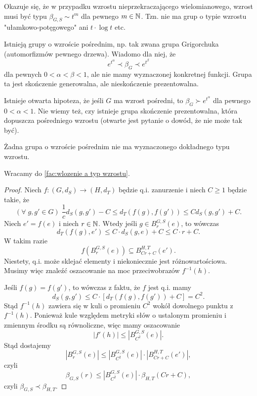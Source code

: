 Okazuje się, że w przypadku wzrostu nieprzekraczającego wielomianowego, wzrost musi być typu $\beta_{G,S}\sim t^m$ dla pewnego $m\in\mathbb{N}$. Tzn. nie ma grup o typie wzrostu "ułamkowo-potęgowego" ani $t\cdot\log t$ etc.

Istnieją grupy o wzroście pośrednim, np. tak zwana grupa Grigorchuka (automorfizmów pewnego drzewa). Wiadomo dla niej, że 
$$e^{t^\alpha}\prec \beta_G\prec e^{t^\beta}$$
dla pewnych $0<\alpha<\beta<1$, ale nie mamy wyznaczonej konkretnej funkcji. Grupa ta jest skończenie generowalna, ale nieskończenie prezentowalna.

Istnieje otwarta hipoteza, że jeśli $G$ ma wzrost pośredni, to $\beta_G\succ e^{t^\alpha}$ dla pewnego $0<\alpha<1$. Nie wiemy też, czy istnieje grupa skończenie prezentowalna, która dopuszcza pośredniego wzrostu (otwarte jest pytanie o dowód, że nie może tak być).

Żadna grupa o wzroście pośrednim nie ma wyznaczonego dokładnego typu wzrostu.

Wracamy do \ref{fac:wlozenie a typ wzrostu}.

\begin{proof}

  Niech $f:(G, d_S)\to (H, d_T)$ będzie q.i. zanurzenie i niech $C\geq 1$ będzie takie, że 
  $$(\forall\;g,g'\in G)\;\frac{1}{c}d_S(g, g') - C\leq d_T(f(g), f(g'))\leq Cd_S(g, g') + C.$$
  Niech $e'=f(e)$ i niech $r\in \mathbb{N}$. Wtedy jeśli $g\in B^{G,S}_r(e)$, to wówczas 
  $$d_T(f(g), e')\leq C\cdot d_S(g, e)+C\leq C\cdot r+C.$$
  W takim razie
  $$f\left(B_r^{G,S}(e)\right)\subseteq B_{Cr+C}^{H,T}(e').$$
  Niestety, q.i. może sklejać elementy i niekoniecznie jest różnowartościowa. Musimy więc znaleźć oszacowanie na moc przeciwobrazów $f^{-1}(h)$.

  Jeśli $f(g)=f(g')$, to wówczas z faktu, że $f$ jest q.i. mamy
  $$d_S(g, g')\leq C\cdot [d_T(f(g), f(g'))+C]=C^2.$$
  Stąd $f^{-1}(h)$ zawiera się w kuli o promieniu $C^2$ wokół dowolnego punktu z $f^{-1}(h)$. Ponieważ kule względem metryki słów o ustalonym promieniu i zmiennym środku są równoliczne, więc mamy oszacowanie
  $$|f'(h)|\leq \left| B_{C^2}^{G, S}(e) \right|.$$
  Stąd dostajemy 
  $$\left|B_r^{G,S}(e)\right| \leq \left| B_{C^2}^{G,S}(e) \right|\cdot \left| B_{Cr+C}^{H,T}(e') \right|, $$
  czyli 
  $$\beta_{G,S}(r)\leq \left| B_{C^2}^{G,S}(e) \right|\cdot \beta_{H,T}(Cr+C), $$
  czyli $\beta_{G,S}\prec \beta_{H,T}$.
\end{proof}

